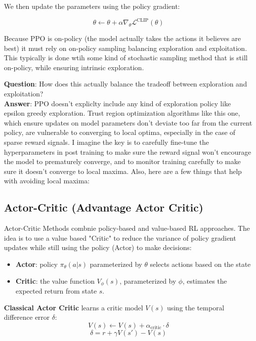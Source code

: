 \documentclass[12pt]{article}
\begin{document}
We then update the parameters using the policy gradient: 

\[\theta \leftarrow \theta + \alpha \nabla_\theta\mathcal{L}^{\text{CLIP}}(\theta)\]

Because PPO is on-policy (the model actually takes the actions it believes are best) it must rely on on-policy sampling balancing exploration and exploitation. This typically is done wtih some kind of stochastic sampling method that is still on-policy, while ensuring intrinsic exploration.

\textbf{Question}: How does this actually balance the tradeoff between exploration and exploitation? \\

\textbf{Answer}: PPO doesn't expliclty include any kind of exploration policy like epsilon greedy exploration. Trust region optimization algorithms like this one, which ensure updates on model parameters don't deviate too far from the current policy, are vulnerable to converging to local optima, especially in the case of sparse reward signals. I imagine the key is to carefully fine-tune the hyperparameters in post training to make sure the reward signal won't encourage the model to prematurely converge, and to monitor training carefully to make sure it doesn't converge to local maxima. Also, here are a few things that help with avoiding local maxima:




\subsection{Actor-Critic (Advantage Actor Critic)}
Actor-Critic Methods combnie policy-based and value-based RL approaches. The idea is to use a value based "Critic" to reduce the variance of policy gradient updates while still using the policy (Actor) to make decisions:
\begin{itemize}
\item \textbf{Actor}: policy \(\pi_\theta(a|s)\) parameterized by \(\theta\) selects actions based on the state
\item \textbf{Critic}: the value function \(V_\phi(s)\), parameterized by \(\phi\), estimates the expected return from state \(s\).
\end{itemize}
\textbf{Classical Actor Critic} learns a critic model \(V(s)\) using the temporal difference error \(\delta\):
\[V(s) \leftarrow V(s) + \alpha_\text{critic}\cdot \delta\]
\[\delta = r + \gamma V(s') - V(s)\]
\end{document}
